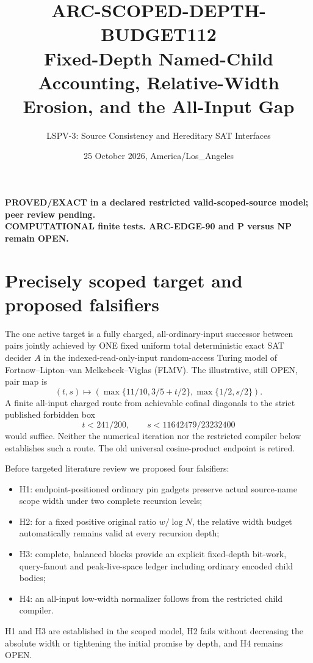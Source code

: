 \documentclass[11pt]{article}
\title{ARC-SCOPED-DEPTH-BUDGET112\\
\large Fixed-Depth Named-Child Accounting, Relative-Width Erosion, and the All-Input Gap}
\author{LSPV-3: Source Consistency and Hereditary SAT Interfaces}
\date{25 October 2026, America/Los\_Angeles}
\begin{document}
\maketitle
\begin{center}
\textbf{PROVED/EXACT in a declared restricted valid-scoped-source model; peer review pending.}\\
\textbf{COMPUTATIONAL finite tests. ARC-EDGE-90 and P versus NP remain OPEN.}
\end{center}

\section{Precisely scoped target and proposed falsifiers}
The one active target is a fully charged, all-ordinary-input successor between pairs jointly achieved by ONE fixed uniform total deterministic exact SAT decider $A$ in the indexed-read-only-input random-access Turing model of Fortnow--Lipton--van Melkebeek--Viglas (FLMV). The illustrative, still OPEN, pair map is
\[
(t,s)\mapsto(\max\{11/10,3/5+t/2\},\max\{1/2,s/2\}).
\]
A finite all-input charged route from achievable cofinal diagonals to the strict published forbidden box
\[
t<241/200,\qquad s<11642479/23232400
\]
would suffice. Neither the numerical iteration nor the restricted compiler below establishes such a route. The old universal cosine-product endpoint is retired.

Before targeted literature review we proposed four falsifiers:
\begin{itemize}
\item[] H1: endpoint-positioned ordinary pin gadgets preserve actual source-name scope width under two complete recursion levels;
\item[] H2: for a fixed positive original ratio $w/\log N$, the relative width budget automatically remains valid at every recursion depth;
\item[] H3: complete, balanced blocks provide an explicit fixed-depth bit-work, query-fanout and peak-live-space ledger including ordinary encoded child bodies;
\item[] H4: an all-input low-width normalizer follows from the restricted child compiler.
\end{itemize}
H1 and H3 are established in the scoped model, H2 fails without decreasing the absolute width or tightening the initial promise by depth, and H4 remains OPEN.
\end{document}
